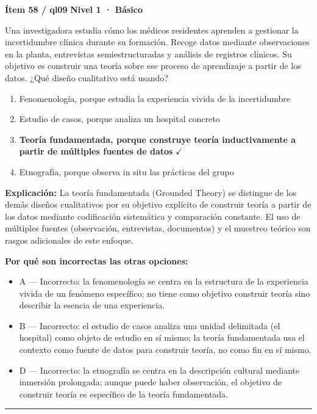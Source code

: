 \documentclass[12pt,a4paper]{article}
\begin{document}
\begin{mdframed}[backgroundcolor=fondogris,linecolor=azul,linewidth=1pt,innerleftmargin=10pt,innerrightmargin=10pt,innertopmargin=7pt,innerbottommargin=7pt]
\textbf{Ítem 58 / ql09} \hfill {\small\bfseries\color{azul} Nivel 1 · Básico}
\end{mdframed}

Una investigadora estudia cómo los médicos residentes aprenden a gestionar la incertidumbre clínica durante su formación. Recoge datos mediante observaciones en la planta, entrevistas semiestructuradas y análisis de registros clínicos. Su objetivo es construir una teoría sobre ese proceso de aprendizaje a partir de los datos. ¿Qué diseño cualitativo está usando?

\begin{enumerate}
  \item[A.] Fenomenología, porque estudia la experiencia vivida de la incertidumbre
  \item[B.] Estudio de casos, porque analiza un hospital concreto
  \item[\textbf{\color{verde}C.}] \textbf{\color{verde} Teoría fundamentada, porque construye teoría inductivamente a partir de múltiples fuentes de datos} \hfill $\checkmark$
  \item[D.] Etnografía, porque observa in situ las prácticas del grupo
\end{enumerate}

\noindent\textbf{\color{azul}Explicación:} La teoría fundamentada (Grounded Theory) se distingue de los demás diseños cualitativos por su objetivo explícito de construir teoría a partir de los datos mediante codificación sistemática y comparación constante. El uso de múltiples fuentes (observación, entrevistas, documentos) y el muestreo teórico son rasgos adicionales de este enfoque.

\noindent\textbf{\color{gris}Por qué son incorrectas las otras opciones:}
\begin{itemize}
  \item {\small A — Incorrecto: la fenomenología se centra en la estructura de la experiencia vivida de un fenómeno específico; no tiene como objetivo construir teoría sino describir la esencia de una experiencia.}
  \item {\small B — Incorrecto: el estudio de casos analiza una unidad delimitada (el hospital) como objeto de estudio en sí mismo; la teoría fundamentada usa el contexto como fuente de datos para construir teoría, no como fin en sí mismo.}
  \item {\small D — Incorrecto: la etnografía se centra en la descripción cultural mediante inmersión prolongada; aunque puede haber observación, el objetivo de construir teoría es específico de la teoría fundamentada.}
\end{itemize}
\vspace{8pt}\hrule\vspace{10pt}
\end{document}
